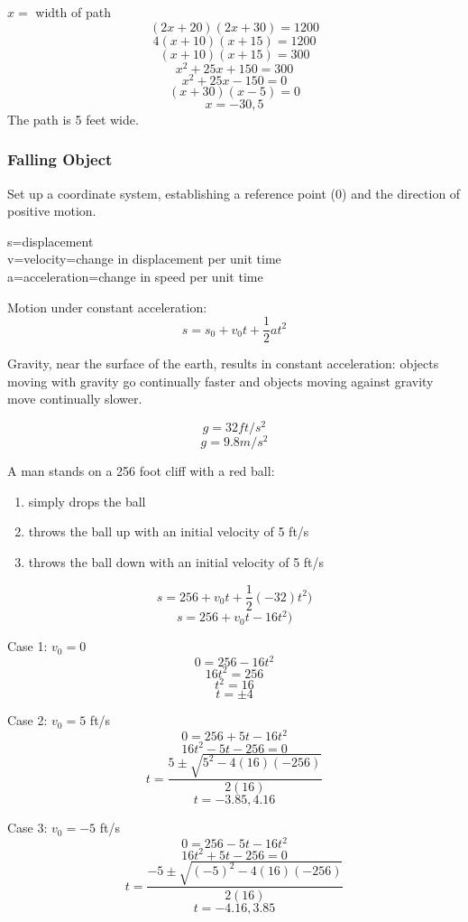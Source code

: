 \documentclass[letterpaper,12pt,fleqn]{article}
\begin{document}

$x=$ width of path
\[(2x+20)(2x+30)=1200\]
\[4(x+10)(x+15)=1200\]
\[(x+10)(x+15)=300\]
\[x^2+25x+150=300\]
\[x^2+25x-150=0\]
\[(x+30)(x-5)=0\]
\[x=-30,5\]
The path is 5 feet wide.

\subsubsection*{Falling Object}

Set up a coordinate system, establishing a reference point (0) and the
direction of positive motion.

s=displacement \\
v=velocity=change in displacement per unit time \\
a=acceleration=change in speed per unit time

Motion under constant acceleration:
\[s=s_0+v_0t+\frac{1}{2}at^2\]

Gravity, near the surface of the earth, results in constant acceleration:
objects moving with gravity go continually faster and objects moving against
gravity move continually slower.

\[g=32 ft/s^2\]
\[g=9.8 m/s^2\]

A man stands on a 256 foot cliff with a red ball:
\begin{enumerate}
\item simply drops the ball
\item throws the ball up with an initial velocity of 5 ft/s
\item throws the ball down with an initial velocity of 5 ft/s
\end{enumerate}

\[s=256+v_0t+\frac{1}{2}(-32)t^2)\]
\[s=256+v_0t-16t^2)\]

Case 1: $v_0=0$
\[0=256-16t^2\]
\[16t^2=256\]
\[t^2=16\]
\[t=\pm4\]

Case 2: $v_0=5$ ft/s
\[0=256+5t-16t^2\]
\[16t^2-5t-256=0\]
\[t=\frac{5\pm\sqrt{5^2-4(16)(-256)}}{2(16)}\]
\[t=-3.85,4.16\]

Case 3: $v_0=-5$ ft/s
\[0=256-5t-16t^2\]
\[16t^2+5t-256=0\]
\[t=\frac{-5\pm\sqrt{(-5)^2-4(16)(-256)}}{2(16)}\]
\[t=-4.16,3.85\]
\end{document}
